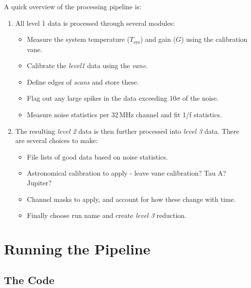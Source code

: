 \documentclass[11pt]{article}
\begin{document}
\vspace{0.5cm}
\noindent
A quick overview of the processing pipeline is:
\begin{enumerate}
 \item All level 1 data is processed through several modules:
   \begin{itemize}
     \item Measure the system temperature ($T_\mathrm{sys}$) and gain ($G$) using the calibration vane. 
     \item Calibrate the \textit{level1} data using the \textit{vane}. 
     \item Define edges of \textit{scans} and store these. 
     \item Flag out any large spikes in the data exceeding $10\sigma$ of the noise. 
     \item Measure noise statistics per 32\,MHz channel and fit 1/f statistics. 
   \end{itemize}
 \item The resulting \textit{level 2} data is then further processed into \textit{level 3} data. There are several choices to make:
   \begin{itemize}
     \item File lists of good data based on noise statistics.
     \item Astronomical calibration to apply - leave vane calibration? Tau A? Jupiter?
     \item Channel masks to apply, and account for how these change with time.
     \item Finally choose run name and create \textit{level 3} reduction. 
   \end{itemize}
\end{enumerate}

\section{Running the Pipeline}

\subsection{The Code}
\end{document}
